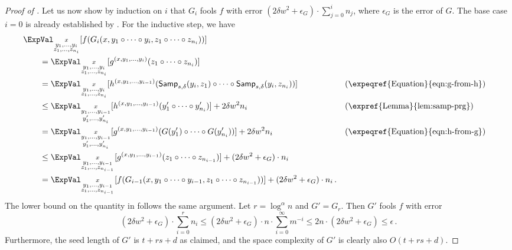\begin{proof}[Proof of ]
Let us now show by induction on $i$ that $G_i$ fools $f$ with error $(2\delta w^2 + \epsilon_G) \cdot \sum_{j = 0}^i n_j$, where $\epsilon_G$ is the error of $G$. The base case $i = 0$ is already established by . For the inductive step, we have
\begin{align}
&\ExpVal_{\substack{x \\ y_1, \dots, y_i \\ z_1, \dots, z_{n_i}}}[f(G_i(x, y_1 \circ \dots \circ y_i, z_1 \circ \dots \circ z_{n_i}))] \label{eqn:prg-exp} \\
&\qquad= \ExpVal_{\substack{x \\ y_1, \dots, y_i \\ z_1, \dots, z_{n_i}}}[g^{(x, y_1, \dots, y_i)}(z_1 \circ \dots \circ z_{n_i})] \nonumber \\
&\qquad= \ExpVal_{\substack{x \\ y_1, \dots, y_i \\ z_1, \dots, z_{n_i}}}[h^{(x, y_1, \dots, y_{i - 1})}(\mathsf{Samp}_{s, \delta}(y_i, z_1) \circ \dots \circ \mathsf{Samp}_{s, \delta}(y_i, z_{n_i}))] && (\text{\expeqref{Equation}{eqn:g-from-h}}) \nonumber \\
&\qquad\leq \ExpVal_{\substack{x \\ y_1, \dots, y_{i - 1} \\ y_1', \dots, y_{n_i}'}}[h^{(x, y_1, \dots, y_{i - 1})}(y_1' \circ \dots \circ y_{n_i}')] + 2\delta w^2 n_i && \text{(\expref{Lemma}{lem:samp-prg})} \nonumber \\
&\qquad= \ExpVal_{\substack{x \\ y_1, \dots, y_{i - 1} \\ y_1', \dots, y_{n_i}'}}[g^{(x, y_1, \dots, y_{i - 1})}(G(y_1') \circ \dots \circ G(y_{n_i}'))] + 2\delta w^2 n_i && (\text{\expeqref{Equation}{eqn:h-from-g}}) \nonumber \\
&\qquad\leq \ExpVal_{\substack{x \\ y_1, \dots, y_{i - 1} \\ z_1, \dots, z_{n_{i - 1}}}}[g^{(x, y_1, \dots, y_{i - 1})}(z_1 \circ \dots \circ z_{n_{i - 1}})] + (2\delta w^2 + \epsilon_G) \cdot n_i \nonumber \\
&\qquad= \ExpVal_{\substack{x \\ y_1, \dots, y_{i - 1} \\ z_1, \dots, z_{n_{i - 1}}}}[f(G_{i - 1}(x, y_1 \circ \dots \circ y_{i - 1}, z_1 \circ \dots \circ z_{n_{i - 1}}))] + (2\delta w^2 + \epsilon_G) \cdot n_i\,. \nonumber
\end{align}
The lower bound on the quantity in  follows the same argument.
Let $r = \log^{\alpha} n$ and $G' = G_r$. Then $G'$ fools $f$ with error
$$
(2\delta w^2 + \epsilon_G) \cdot \sum_{i = 0}^r n_i \leq (2\delta w^2 + \epsilon_G) \cdot n \cdot \sum_{i = 0}^{\infty} m^{-i} \leq 2n \cdot (2\delta w^2 + \epsilon_G) \leq \epsilon\,.
$$
Furthermore, the seed length of $G'$ is $t + rs + d$ as claimed, and the space complexity of $G'$ is clearly also $O(t + rs + d)$.
\end{proof}

